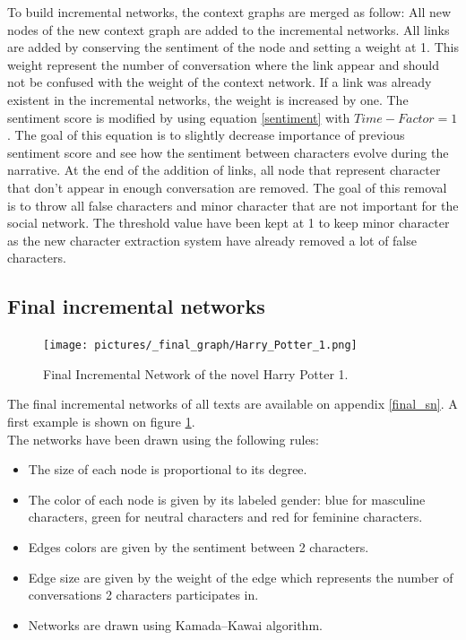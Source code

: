 \documentclass[a4paper, 12pt]{report}
\begin{document}
To build incremental networks, the context graphs are merged as follow: All new nodes of the new context graph are added to the incremental networks. 
All links are added by conserving the sentiment of the node and setting a weight at 1. This weight represent the number of conversation where the link appear and should not be confused with the weight of the context network. If a link was already existent in the incremental networks, the weight is increased by one. 
The sentiment score is modified by using equation \ref{sentiment} with $Time-Factor = 1$.
 The goal of this equation is to slightly decrease importance of previous sentiment score and see how the sentiment between characters evolve during the narrative. 
At the end of the addition of links, all node that represent character that don't appear in enough conversation are removed. The goal of this removal is to throw all false characters and minor character that are not important for the social network. The threshold value have been kept at 1 to keep minor character as the new character extraction system have already removed a lot of false characters.\\

\subsection{Final incremental networks}

\begin{figure}
        \centering
        \texttt{[image: pictures/\_final\_graph/Harry\_Potter\_1.png]}
        \caption{Final Incremental Network of the novel Harry Potter 1.}
  	\label{sn_harry}
\end{figure}

The final incremental networks of all texts are available on appendix \ref{final_sn}. A first example is shown on figure \ref{sn_harry}.\\
The networks have been drawn using the following rules:
\begin{itemize}
\item The size of each node is proportional to its degree.
\item The color of each node is given by its labeled gender: blue for masculine characters, green for neutral characters and red for feminine characters.
\item Edges colors are given by the sentiment between 2 characters.
\item Edge size are given by the weight of the edge which represents the number of conversations 2 characters participates in.
\item Networks are drawn using Kamada–Kawai algorithm. 
\end{itemize}
\end{document}
